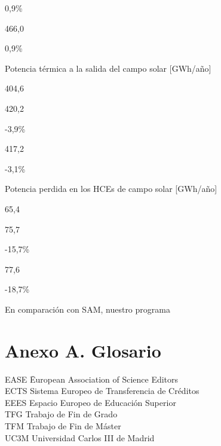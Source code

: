 \documentclass[12pt]{report} %
\begin{document}
0,9\%

466,0

0,9\%

Potencia térmica a la salida del campo solar {[}GWh/año{]}

404,6

420,2

-3,9\%

417,2

-3,1\%

Potencia perdida en los HCEs de campo solar {[}GWh/año{]}

65,4

75,7

-15,7\%

77,6

-18,7\%

En comparación con SAM, nuestro programa





















	



\clearpage
{}
\printbibliography




\chapter* {Anexo A. Glosario}

\begin{tabbing}	
EASE \quad\=	European Association of Science Editors \\
ECTS \>	Sistema Europeo de Transferencia de Créditos \\
EEES \> Espacio Europeo de Educación Superior \\
TFG	\>	Trabajo de Fin de Grado \\
TFM	\>	Trabajo de Fin de Máster \\
UC3M \>	Universidad Carlos III de Madrid 
\end{tabbing}
\end{document}
